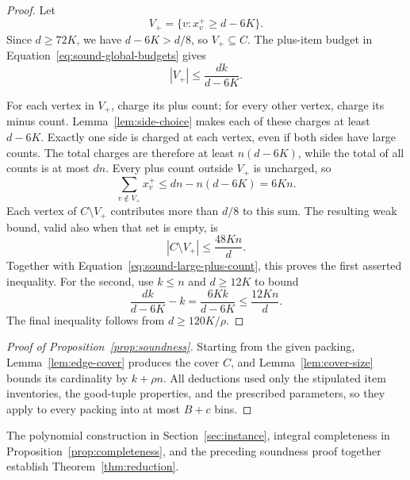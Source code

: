 \begin{proof}
Let
\[
 V_+=\{v:x_v^+\ge d-6K\}.
\]
Since \(d\ge72K\), we have \(d-6K>d/8\), so \(V_+\subseteq C\).
The plus-item budget in Equation~\eqref{eq:sound-global-budgets}
gives
\begin{equation}\label{eq:sound-large-plus-count}
 |V_+|\le\frac{dk}{d-6K}.
\end{equation}

For each vertex in \(V_+\), charge its plus count; for every
other vertex, charge its minus count.
Lemma~\ref{lem:side-choice} makes each of these charges at least
\(d-6K\).  Exactly one side is charged at each vertex, even if
both sides have large counts.  The total charges are therefore
at least \(n(d-6K)\), while the total of all counts is at most
\(dn\).  Every plus count outside \(V_+\) is uncharged, so
\begin{equation}\label{eq:sound-residual-plus}
 \sum_{v\notin V_+}x_v^+\le dn-n(d-6K)=6Kn.
\end{equation}
Each vertex of \(C\setminus V_+\) contributes more than \(d/8\)
to this sum.  The resulting weak bound, valid also when that
set is empty, is
\[
 |C\setminus V_+|\le\frac{48Kn}{d}.
\]
Together with Equation~\eqref{eq:sound-large-plus-count}, this
proves the first asserted inequality.  For the second, use
\(k\le n\) and \(d\ge12K\) to bound
\[
 \frac{dk}{d-6K}-k
 =\frac{6Kk}{d-6K}\le\frac{12Kn}{d}.
\]
The final inequality follows from \(d\ge120K/\rho\).
\end{proof}

\begin{proof}[Proof of Proposition~\ref{prop:soundness}]
Starting from the given packing, Lemma~\ref{lem:edge-cover}
produces the cover \(C\), and Lemma~\ref{lem:cover-size}
bounds its cardinality by \(k+\rho n\).
All deductions used only the stipulated item inventories,
the good-tuple properties, and the prescribed parameters,
so they apply to every packing into at most \(B+c\) bins.
\end{proof}

The polynomial construction in Section~\ref{sec:instance}, integral
completeness in Proposition~\ref{prop:completeness}, and the preceding
soundness proof together establish Theorem~\ref{thm:reduction}.
